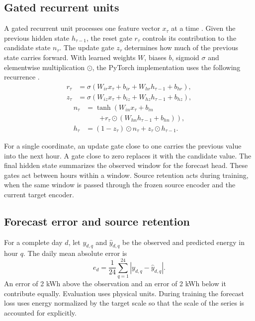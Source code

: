 \subsection{Gated recurrent units}
A gated recurrent unit processes one feature vector $x_\tau$ at a time \cite{cho2014}. Given the previous hidden state $h_{\tau-1}$, the reset gate $r_\tau$ controls its contribution to the candidate state $n_\tau$. The update gate $z_\tau$ determines how much of the previous state carries forward. With learned weights $W$, biases $b$, sigmoid $\sigma$ and elementwise multiplication $\odot$, the PyTorch implementation uses the following recurrence \cite{pytorch211}.
\begingroup\small
\begin{equation}\begin{aligned}
r_\tau&=\sigma(W_{ir}x_\tau+b_{ir}+W_{hr}h_{\tau-1}+b_{hr}),\\
z_\tau&=\sigma(W_{iz}x_\tau+b_{iz}+W_{hz}h_{\tau-1}+b_{hz}),
\end{aligned}\label{eq:gates}\end{equation}
\endgroup
\begin{equation}\begin{aligned}
n_\tau&=\tanh\!\left(W_{in}x_\tau+b_{in}\right.\\
&\qquad\left.+r_\tau\odot(W_{hn}h_{\tau-1}+b_{hn})\right),\\
h_\tau&=(1-z_\tau)\odot n_\tau+z_\tau\odot h_{\tau-1}.
\end{aligned}\label{eq:hidden}\end{equation}

For a single coordinate, an update gate close to one carries the previous value into the next hour. A gate close to zero replaces it with the candidate value. The final hidden state summarizes the observed window for the forecast head. These gates act between hours within a window. Source retention acts during training, when the same window is passed through the frozen source encoder and the current target encoder.

\subsection{Forecast error and source retention}

For a complete day $d$, let $y_{d,q}$ and $\hat y_{d,q}$ be the observed and predicted energy in hour $q$. The daily mean absolute error is
\begin{equation}
e_d=\frac{1}{24}\sum_{q=1}^{24}|y_{d,q}-\hat y_{d,q}|.
\end{equation}
An error of 2 kWh above the observation and an error of 2 kWh below it contribute equally. Evaluation uses physical units. During training the forecast loss uses energy normalized by the target scale so that the scale of the series is accounted for explicitly.

